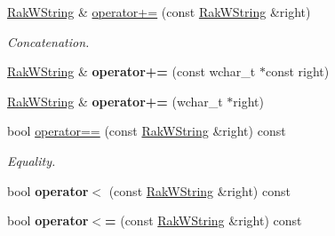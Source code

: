 \begin{DoxyCompactItemize}
\item 
\hypertarget{class_rak_net_1_1_rak_w_string_a83970e624bff1bc237629823107b66e4}{\hyperlink{class_rak_net_1_1_rak_w_string}{Rak\-W\-String} \& \hyperlink{class_rak_net_1_1_rak_w_string_a83970e624bff1bc237629823107b66e4}{operator+=} (const \hyperlink{class_rak_net_1_1_rak_w_string}{Rak\-W\-String} \&right)}\label{class_rak_net_1_1_rak_w_string_a83970e624bff1bc237629823107b66e4}

\begin{DoxyCompactList}\small\item\em Concatenation. \end{DoxyCompactList}\item 
\hypertarget{class_rak_net_1_1_rak_w_string_afcb49cbe8da4d58afe7e991426d39ef9}{\hyperlink{class_rak_net_1_1_rak_w_string}{Rak\-W\-String} \& {\bfseries operator+=} (const wchar\-\_\-t $\ast$const right)}\label{class_rak_net_1_1_rak_w_string_afcb49cbe8da4d58afe7e991426d39ef9}

\item 
\hypertarget{class_rak_net_1_1_rak_w_string_aef1f66683de34a33bf5354a2b5926da1}{\hyperlink{class_rak_net_1_1_rak_w_string}{Rak\-W\-String} \& {\bfseries operator+=} (wchar\-\_\-t $\ast$right)}\label{class_rak_net_1_1_rak_w_string_aef1f66683de34a33bf5354a2b5926da1}

\item 
\hypertarget{class_rak_net_1_1_rak_w_string_a3ca32adfa08d2e607b7b1eea30bd01c2}{bool \hyperlink{class_rak_net_1_1_rak_w_string_a3ca32adfa08d2e607b7b1eea30bd01c2}{operator==} (const \hyperlink{class_rak_net_1_1_rak_w_string}{Rak\-W\-String} \&right) const }\label{class_rak_net_1_1_rak_w_string_a3ca32adfa08d2e607b7b1eea30bd01c2}

\begin{DoxyCompactList}\small\item\em Equality. \end{DoxyCompactList}\item 
\hypertarget{class_rak_net_1_1_rak_w_string_a692083aaaa8795ae74af09fec13bc40c}{bool {\bfseries operator$<$} (const \hyperlink{class_rak_net_1_1_rak_w_string}{Rak\-W\-String} \&right) const }\label{class_rak_net_1_1_rak_w_string_a692083aaaa8795ae74af09fec13bc40c}

\item 
\hypertarget{class_rak_net_1_1_rak_w_string_a5ad0115f3244aa45c99c8f0f3b4309c5}{bool {\bfseries operator$<$=} (const \hyperlink{class_rak_net_1_1_rak_w_string}{Rak\-W\-String} \&right) const }\label{class_rak_net_1_1_rak_w_string_a5ad0115f3244aa45c99c8f0f3b4309c5}


\end{DoxyCompactItemize}
